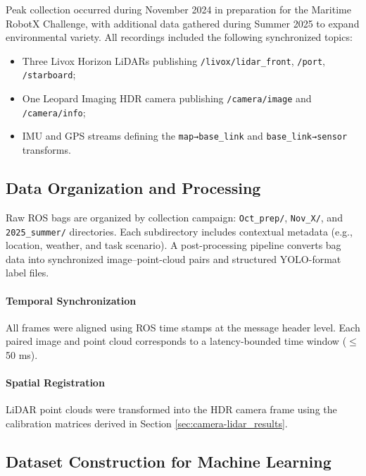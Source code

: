 \documentclass{erauthesis}
\begin{document}
Peak collection occurred during November 2024 in preparation for the Maritime RobotX Challenge, 
with additional data gathered during Summer 2025 to expand environmental variety.  
All recordings included the following synchronized topics:
\begin{itemize}[noitemsep,leftmargin=1.5em]
    \item Three Livox Horizon LiDARs publishing \texttt{/livox/lidar\_front}, \texttt{/port}, \texttt{/starboard};
    \item One Leopard Imaging HDR camera publishing \texttt{/camera/image} and \texttt{/camera/info};
    \item IMU and GPS streams defining the \texttt{map→base\_link} and \texttt{base\_link→sensor} transforms.
\end{itemize}

\subsection{Data Organization and Processing}
\label{sec:data_organization}

Raw ROS bags are organized by collection campaign:
\texttt{Oct\_prep/}, \texttt{Nov\_X/}, and \texttt{2025\_summer/} directories.  
Each subdirectory includes contextual metadata (e.g., location, weather, and task scenario).  
A post-processing pipeline converts bag data into synchronized image–point-cloud pairs and structured YOLO-format label files.  

\paragraph{Temporal Synchronization}  
All frames were aligned using ROS time stamps at the message header level.  
Each paired image and point cloud corresponds to a latency-bounded time window ($\le$ 50 ms).  

\paragraph{Spatial Registration}  
LiDAR point clouds were transformed into the HDR camera frame using the calibration matrices 
derived in Section \ref{sec:camera-lidar_results}.  

\subsection{Dataset Construction for Machine Learning}
\label{sec:dataset_construction}
\end{document}
